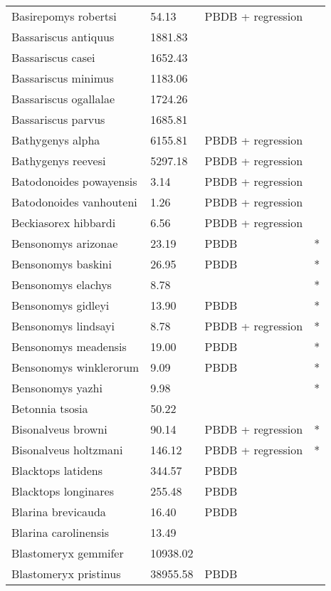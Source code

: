\documentclass{article}
\begin{document}
\begin{center}
\begin{longtable}{p{} p{} p{} p{}}
    Basirepomys robertsi & 54.13 & PBDB + regression &  \\ 
    Bassariscus antiquus & 1881.83 & \cite{Tomiya2013} &  \\ 
    Bassariscus casei & 1652.43 & \cite{Tomiya2013} &  \\ 
    Bassariscus minimus & 1183.06 & \cite{Robinson1966} &  \\ 
    Bassariscus ogallalae & 1724.26 & \cite{Gidley1920} &  \\ 
    Bassariscus parvus & 1685.81 & \cite{Tomiya2013} &  \\ 
    Bathygenys alpha & 6155.81 & PBDB + regression &  \\ 
    Bathygenys reevesi & 5297.18 & PBDB + regression &  \\ 
    Batodonoides powayensis & 3.14 & PBDB + regression &  \\ 
    Batodonoides vanhouteni & 1.26 & PBDB + regression &  \\ 
    Beckiasorex hibbardi & 6.56 & PBDB + regression &  \\ 
    Bensonomys arizonae & 23.19 & PBDB & * \\ 
    Bensonomys baskini & 26.95 & PBDB & * \\ 
    Bensonomys elachys & 8.78 & \cite{Kirk2011} & * \\ 
    Bensonomys gidleyi & 13.90 & PBDB & * \\ 
    Bensonomys lindsayi & 8.78 & PBDB + regression & * \\ 
    Bensonomys meadensis & 19.00 & PBDB & * \\ 
    Bensonomys winklerorum & 9.09 & PBDB & * \\ 
    Bensonomys yazhi & 9.98 & \cite{Rose2013a} & * \\ 
    Betonnia tsosia & 50.22 & \cite{Clemens2005} &  \\ 
    Bisonalveus browni & 90.14 & PBDB + regression & * \\ 
    Bisonalveus holtzmani & 146.12 & PBDB + regression & * \\ 
    Blacktops latidens & 344.57 & PBDB &  \\ 
    Blacktops longinares & 255.48 & PBDB &  \\ 
    Blarina brevicauda & 16.40 & PBDB &  \\ 
    Blarina carolinensis & 13.49 & \cite{Smith2004} &  \\ 
    Blastomeryx gemmifer & 10938.02 & \cite{Tomiya2013} &  \\ 
    Blastomeryx pristinus & 38955.58 & PBDB &  \\ 

\end{longtable}
\end{center}
\end{document}

